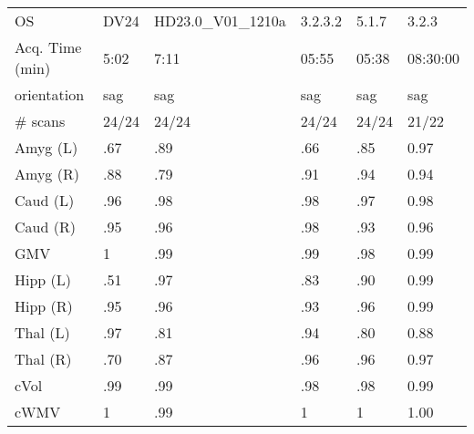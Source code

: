 \documentclass{article}
\begin{document}
\begin{table}
\begin{tabular}{llllll}
OS                    &                      DV24 &            HD23.0\_V01\_1210a &               3.2.3.2 &              5.1.7 &                3.2.3 \\
Acq. Time (min)       &               5:02 &  7:11 &              05:55 &           05:38 &             08:30:00 \\
orientation           &               sag &                         sag &                   sag &                sag &                  sag \\
\# scans & 24/24 & 24/24 & 24/24 & 24/24 & 21/22 \\
\midrule
Amyg (L)              &                   .67 &                        .89 &                  .66 &               .85 &                 0.97 \\
Amyg (R)              &                   .88 &                        .79 &                  .91 &               .94 &                 0.94 \\
Caud (L)              &                   .96 &                        .98 &                  .98 &               .97 &                 0.98 \\
Caud (R)              &                   .95 &                        .96 &                  .98 &               .93 &                 0.96 \\
GMV                   &                   1 &                        .99 &                  .99 &               .98 &                 0.99 \\
Hipp (L)              &                   .51 &                        .97 &                  .83 &               .90 &                 0.99 \\
Hipp (R)              &                   .95 &                        .96 &                  .93 &               .96 &                 0.99 \\
Thal (L)              &                   .97 &                        .81 &                  .94 &               .80 &                 0.88 \\
Thal (R)              &                   .70 &                        .87 &                  .96 &               .96 &                 0.97 \\
cVol                  &                   .99 &                        .99 &                  .98 &               .98 &                 0.99 \\
cWMV                  &                   1 &                        .99 &                  1 &               1 &                 1.00 \\

\end{tabular}
\end{table}
\end{document}
